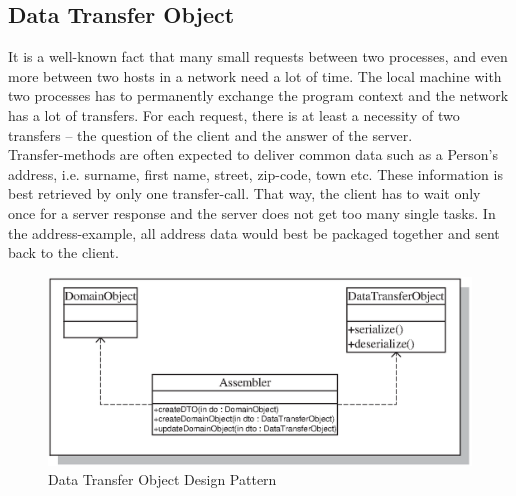 %
%
%
%
%
%
%

\subsection{Data Transfer Object}
\label{data_transfer_object_heading}

It is a well-known fact that many small requests between two processes, and even
more between two hosts in a network need a lot of time. The local machine with
two processes has to permanently exchange the program context and the network
has a lot of transfers. For each request, there is at least a necessity of two
transfers -- the question of the client and the answer of the server.\\
Transfer-methods are often expected to deliver common data such as a Person's
address, i.e. surname, first name, street, zip-code, town etc. These information
is best retrieved by only one transfer-call. That way, the client has to wait
only once for a server response and the server does not get too many single
tasks. In the address-example, all address data would best be packaged together
and sent back to the client.

\begin{figure}[ht]
    \begin{center}
       \includegraphics[scale=0.5]{vector/data_transfer_object.eps}
       \caption{Data Transfer Object Design Pattern \cite{fowler2002}}
       \label{data_transfer_object_figure}
    \end{center}
\end{figure}

